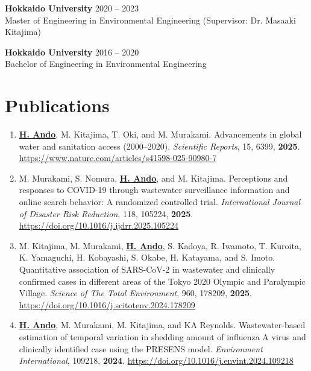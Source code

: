\documentclass[11pt,a4paper]{article}
\begin{document}
\textbf{Hokkaido University} \hfill 2020 -- 2023 \\
Master of Engineering in Environmental Engineering (Supervisor: Dr. Masaaki Kitajima)

\textbf{Hokkaido University} \hfill 2016 -- 2020 \\
Bachelor of Engineering in Environmental Engineering

\vspace{10pt}


\section{Publications}

\begin{enumerate}[label=\arabic*., series=pubcount, leftmargin=1.5em, nosep]
    \small
    \sloppy %
    \setcounter{enumi}{16}

    \item \textbf{\underline{H. Ando}}, M. Kitajima, T. Oki, and M. Murakami. Advancements in global water and sanitation access (2000–2020). \textit{Scientific Reports}, 15, 6399, \textbf{2025}. \url{https://www.nature.com/articles/s41598-025-90980-7}
    \addtocounter{enumi}{-2}

    \item M. Murakami, S. Nomura, \textbf{\underline{H. Ando}}, and M. Kitajima. Perceptions and responses to COVID-19 through wastewater surveillance information and online search behavior: A randomized controlled trial. \textit{International Journal of Disaster Risk Reduction}, 118, 105224, \textbf{2025}. \url{https://doi.org/10.1016/j.ijdrr.2025.105224}
    \addtocounter{enumi}{-2}

    \item M. Kitajima, M. Murakami, \textbf{\underline{H. Ando}}, S. Kadoya, R. Iwamoto, T. Kuroita, K. Yamaguchi, H. Kobayashi, S. Okabe, H. Katayama, and S. Imoto. Quantitative association of SARS-CoV-2 in wastewater and clinically confirmed cases in different areas of the Tokyo 2020 Olympic and Paralympic Village. \textit{Science of The Total Environment}, 960, 178209, \textbf{2025}. \url{https://doi.org/10.1016/j.scitotenv.2024.178209}
    \addtocounter{enumi}{-2}

    \item \textbf{\underline{H. Ando}}, M. Murakami, M. Kitajima, and KA Reynolds. Wastewater-based estimation of temporal variation in shedding amount of influenza A virus and clinically identified case using the PRESENS model. \textit{Environment International}, 109218, \textbf{2024}. \url{https://doi.org/10.1016/j.envint.2024.109218}
    \addtocounter{enumi}{-2}


\end{enumerate}
\end{document}
